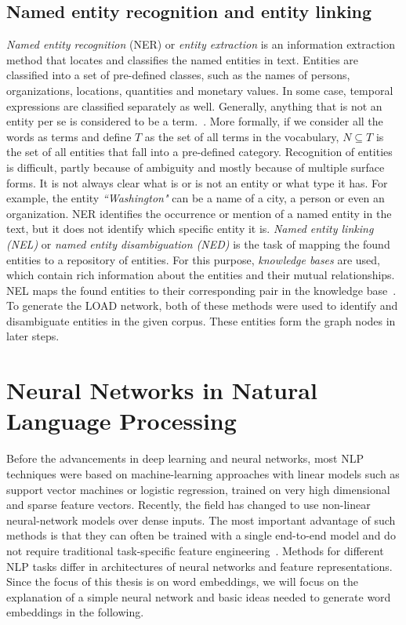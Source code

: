\subsection{Named entity recognition and  entity linking}
\emph{Named entity recognition} (NER) or \emph{entity extraction} is an information extraction method that locates and classifies the named entities in text. Entities are classified into a set of pre-defined classes, such as the names of persons, organizations, locations, quantities and monetary values. In some case, temporal expressions are classified separately as well. Generally, anything that is not an entity per se is considered to be a term.~. More formally, if we consider all the words as terms and define $T$ as the set of all terms in the vocabulary, $N\subseteq T$ is the set of all entities that fall into a pre-defined category. Recognition of entities is difficult, partly because of ambiguity and mostly because of multiple surface forms. It is not always clear what is or is not an entity or what type it has. For example, the entity \emph{``Washington"} can be a name of a city, a person or even an organization. NER identifies the occurrence or mention of a named entity in the text, but it does not identify which specific entity it is. \emph{Named entity linking (NEL)}  or \emph{named entity disambiguation (NED)}  is the task of mapping the found entities to a repository of entities. For this purpose, \emph{knowledge bases} are used, which contain rich information about the entities and their mutual relationships. NEL maps the found entities to their corresponding pair in the knowledge base~. To generate the LOAD network, both of these methods were used to identify and disambiguate entities in the given corpus. These entities form the graph nodes in later steps. 

\section{Neural Networks  in Natural Language Processing }\label{sec:nn}
Before the advancements in deep learning and neural networks, most NLP techniques were based on machine-learning approaches with linear models such as support vector machines or logistic regression, trained on very high dimensional and sparse feature vectors. Recently, the field has changed to use non-linear neural-network models over dense inputs. The most important advantage of such methods is that they can often be trained with a single end-to-end model and do not require traditional task-specific feature engineering~. Methods for different NLP tasks differ in architectures of neural networks and feature representations. Since the focus of this thesis is on word embeddings, we will focus on the explanation of a simple neural network and basic ideas needed to generate word embeddings in the following. 
